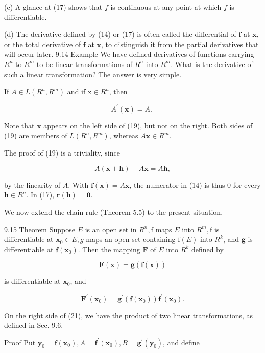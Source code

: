 \documentclass[10pt]{article}
\begin{document}
(c) A glance at (17) shows that $f$ is continuous at any point at which $f$ is differentiable.

(d) The derivative defined by (14) or (17) is often called the differential of $\mathbf{f}$ at $\mathbf{x}$, or the total derivative of $\mathbf{f}$ at $\mathbf{x}$, to distinguish it from the partial derivatives that will occur later. 9.14 Example We have defined derivatives of functions carrying $R^{n}$ to $R^{m}$ to be linear transformations of $R^{n}$ into $R^{m}$. What is the derivative of such a linear transformation? The answer is very simple.

If $A \in L\left(R^{n}, R^{m}\right)$ and if $\mathrm{x} \in R^{n}$, then

$$
A^{\prime}(\mathbf{x})=A \text {. }
$$

Note that $\mathbf{x}$ appears on the left side of (19), but not on the right. Both sides of (19) are members of $L\left(R^{n}, R^{m}\right)$, whereas $A \mathbf{x} \in R^{m}$.

The proof of (19) is a triviality, since

$$
A(\mathbf{x}+\mathbf{h})-A \mathbf{x}=A \mathbf{h},
$$

by the linearity of $A$. With $\mathbf{f}(\mathbf{x})=A \mathbf{x}$, the numerator in (14) is thus 0 for every $\mathbf{h} \in R^{n}$. In (17), $\mathbf{r}(\mathbf{h})=\mathbf{0}$.

We now extend the chain rule (Theorem 5.5) to the present situation.

9.15 Theorem Suppose $E$ is an open set in $R^{n}, \mathrm{f}$ maps $E$ into $R^{m}, \mathrm{f}$ is differentiable at $\mathbf{x}_{0} \in E, g$ maps an open set containing $\mathrm{f}(E)$ into $R^{k}$, and $\mathbf{g}$ is differentiable at $\mathbf{f}\left(\mathbf{x}_{0}\right)$. Then the mapping $\mathbf{F}$ of $E$ into $R^{k}$ defined by

$$
\mathbf{F}(\mathbf{x})=\mathbf{g}(\mathbf{f}(\mathbf{x}))
$$

is differentiable at $\mathbf{x}_{0}$, and

$$
\mathbf{F}^{\prime}\left(\mathbf{x}_{0}\right)=\mathbf{g}^{\prime}\left(\mathbf{f}\left(\mathbf{x}_{0}\right)\right) \mathbf{f}^{\prime}\left(\mathbf{x}_{0}\right) .
$$

On the right side of (21), we have the product of two linear transformations, as defined in Sec. 9.6.

Proof Put $\mathbf{y}_{0}=\mathbf{f}\left(\mathbf{x}_{0}\right), A=\mathbf{f}^{\prime}\left(\mathbf{x}_{0}\right), B=\mathbf{g}^{\prime}\left(\mathbf{y}_{0}\right)$, and define
\end{document}
